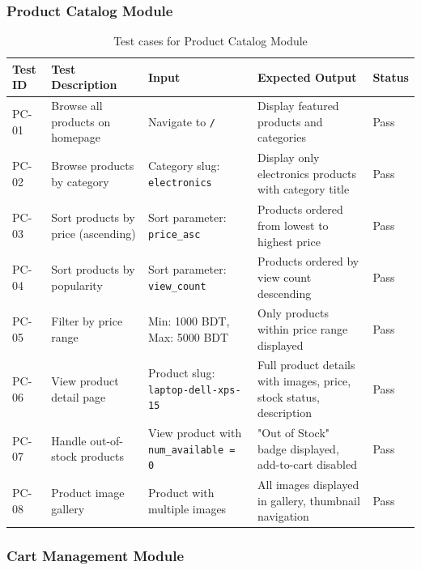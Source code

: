 \subsubsection*{Product Catalog Module}

\begin{table}[H]
\centering
\caption{Test cases for Product Catalog Module}
\label{tab:test-catalog}
\small
\begin{tabular}{|p{1.3cm}|p{3.5cm}|p{3cm}|p{3.5cm}|p{1.2cm}|}
\hline
\textbf{Test ID} & \textbf{Test Description} & \textbf{Input} & \textbf{Expected Output} & \textbf{Status} \\
\hline
PC-01 & Browse all products on homepage & Navigate to \texttt{/} & Display featured products and categories & Pass \\
\hline
PC-02 & Browse products by category & Category slug: \texttt{electronics} & Display only electronics products with category title & Pass \\
\hline
PC-03 & Sort products by price (ascending) & Sort parameter: \texttt{price\_asc} & Products ordered from lowest to highest price & Pass \\
\hline
PC-04 & Sort products by popularity & Sort parameter: \texttt{view\_count} & Products ordered by view count descending & Pass \\
\hline
PC-05 & Filter by price range & Min: 1000 BDT, Max: 5000 BDT & Only products within price range displayed & Pass \\
\hline
PC-06 & View product detail page & Product slug: \texttt{laptop-dell-xps-15} & Full product details with images, price, stock status, description & Pass \\
\hline
PC-07 & Handle out-of-stock products & View product with \texttt{num\_available = 0} & "Out of Stock" badge displayed, add-to-cart disabled & Pass \\
\hline
PC-08 & Product image gallery & Product with multiple images & All images displayed in gallery, thumbnail navigation & Pass \\
\hline
\end{tabular}
\end{table}

\subsubsection*{Cart Management Module}

